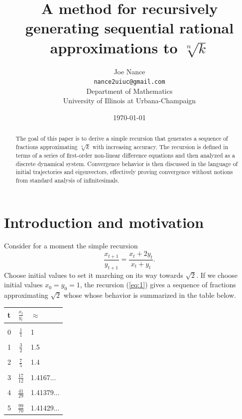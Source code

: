 \documentclass[11pt]{article}
\theoremstyle{plain}
\theoremstyle{definition}
\begin{document}
\title{A method for recursively generating sequential rational approximations to $\sqrt[n]{k}$}
\author{Joe Nance\\
  \texttt{nance2uiuc@gmail.com}\\
  Department of Mathematics \\
  University of Illinois at Urbana-Champaign\\}
\date{\today}
\maketitle

\begin{abstract}
The goal of this paper is to derive a simple recursion that generates a sequence of fractions approximating $\sqrt[n]{k}$ with increasing accuracy. The recursion is defined in terms of a series of first-order non-linear difference equations and then analyzed as a discrete dynamical system. Convergence behavior is then discussed in the language of initial trajectories and eigenvectors, effectively proving convergence without notions from standard analysis of infinitesimals.
\end{abstract}
\clearpage
\section{Introduction and motivation}
Consider for a moment the simple recursion
\begin{equation}\label{eq:1}
\frac{x_{t+1}}{y_{t+1}}=\frac{x_t + 2 y_t}{x_t + y_t}.
\end{equation}
Choose initial values to set it marching on its way towards $\sqrt{2}$. If we choose initial values $x_0=y_0=1$, the recursion (\ref{eq:1}) gives a sequence of fractions approximating $\sqrt{2}$ whose whose behavior is summarized in the table below.
\begin{center}
\begin{tabular}{| l| c| l |}
\hline
t & $\frac{x_t}{y_t}$ & $\approx$ \\
\hline
  &                   & \\
0 & $\frac{1}{1}$ & 1 \\
  &                   & \\
1 & $\frac{3}{2}$ & 1.5 \\
  &                   & \\
2 & $\frac{7}{5}$ & 1.4 \\
  &                   & \\
3 & $\frac{17}{12}$ & 1.4167... \\
  &                   & \\
4 & $\frac{41}{29}$ & 1.41379... \\
  &                   & \\
5 & $\frac{99}{70}$ & 1.41429... \\
\hline
\end{tabular}
\end{center}
\end{document}
